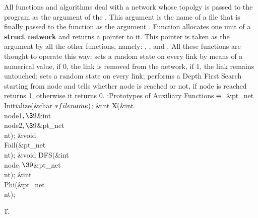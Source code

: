 All functions and algorithms deal with a network whose topolgy is passed to the
program as the argument  of the . This
argument is the name
of a file that is finally passed to the function  as the
argument
. Function  allocates one unit of a {\bf
struct network}
and returns a pointer to it. This pointer is taken as the argument by all the
other functions, namely: , ,  and %
. All these
functions are thought to operate this way:  sets a random state on
every
link by means of a numerical value, if 0, the link is removed from the network,
if 1, the link remains untouched;  sets a random state on
every link;
 performs a Depth First Search starting from node  and
tells 
whether node  is reached or not, if node  is reached  returns 1,
otherwise it returns 0.
\Y\B\4:Prototypes of Auxiliary Functions\X${}\equiv{}$\6
\&{pt\_net} \\{Initialize}(\&{char} ${}{*}\\{filename}){}$;\6
\&{int} \|X(\&{int} \\{node1}${},\39{}$\&{int} \\{node2}${},\39{}$\&{pt\_net} %
\\{nt});\6
\&{void} \\{Fail}(\&{pt\_net} \\{nt});\6
\&{void} \.{DFS}(\&{int} \\{node}${},\39{}$\&{pt\_net} \\{nt});\6
\&{int} \\{Phi}(\&{pt\_net} \\{nt});\par
\U1.\fi

